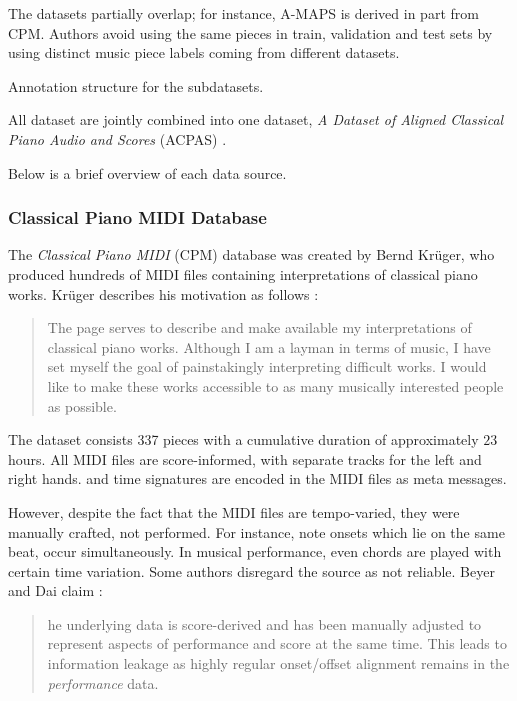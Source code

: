 The datasets partially overlap; for instance, A-MAPS is derived in part from CPM. Authors avoid using the same pieces in train, validation and test sets by using distinct music piece labels coming from different datasets.

\begin{table}[ht!]
\begin{center}

\caption[Annotation structure for the subdatasets.]{Annotation structure for the subdatasets.}
\end{center}
\end{table}

All dataset are jointly combined into one dataset, \emph{A Dataset of Aligned Classical Piano Audio and Scores} (ACPAS) \cite{Liu2021}.

Below is a brief overview of each data source.

\subsubsection{Classical Piano MIDI Database}

The \emph{Classical Piano MIDI} (CPM) database was created by Bernd Krüger, who produced hundreds of MIDI files containing interpretations of classical piano works. Krüger describes his motivation as follows \cite{Krueger1996}:

\begin{quote}The page serves to describe and make available my interpretations of classical piano works. Although I am a layman in terms of music, I have set myself the goal of painstakingly interpreting difficult works. I would like to make these works accessible to as many musically interested people as possible.\end{quote}

The dataset consists 337 pieces with a cumulative duration of approximately $23$ hours. All MIDI files are score-informed, with separate tracks for the left and right hands.  and time signatures are encoded in the MIDI files as meta messages.

However, despite the fact that the MIDI files are tempo-varied, they were manually crafted, not performed. For instance, note onsets which lie on the same beat, occur simultaneously. In musical performance, even chords are played with certain time variation. Some authors disregard the source as not reliable. Beyer and Dai claim \cite{Beyer2024}: \begin{quote}he underlying data is score-derived and has been manually adjusted to represent aspects of performance and score at the same time. This leads to information leakage as highly regular onset/offset alignment remains in the \emph{performance} data.\end{quote}

